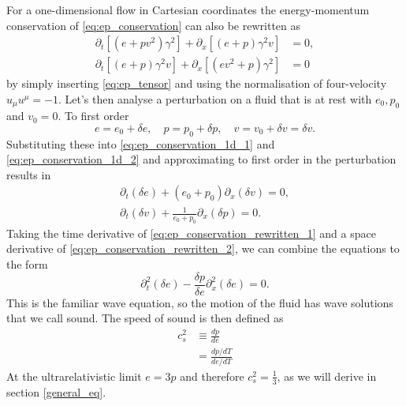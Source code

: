 For a one-dimensional flow in Cartesian coordinates the energy-momentum conservation of \eqref{eq:ep_conservation} can also be rewritten as
\begin{align}
\partial_t \left[ (e+pv^2) \gamma^2 \right] + \partial_x \left[ (e+p) \gamma^2 v \right] &= 0,
\label{eq:ep_conservation_1d_1} \\
\partial_t \left[ (e+p) \gamma^2 v \right] + \partial_x \left[ (ev^2 + p) \gamma^2 \right] &= 0
\label{eq:ep_conservation_1d_2}
\end{align}
by simply inserting \eqref{eq:ep_tensor} and using the normalisation of four-velocity $u_\mu u^\mu = -1$.
Let's then analyse a perturbation on a fluid that is at rest with $e_0, p_0$ and $v_0 = 0$.
To first order
\begin{equation}
e = e_0 + \delta e, \quad p=p_0 + \delta p, \quad v = v_0 + \delta v = \delta v.
\end{equation}
Substituting these into \eqref{eq:ep_conservation_1d_1} and \eqref{eq:ep_conservation_1d_2} and approximating to first order in the perturbation results in
\begin{align}
\partial_t (\delta e) + (e_0 + p_0) \partial_x (\delta v) = 0,
\label{eq:ep_conservation_rewritten_1} \\
\partial_t (\delta v) + \frac{1}{e_0 + p_0} \partial_x (\delta p) = 0.
\label{eq:ep_conservation_rewritten_2}
\end{align}
Taking the time derivative of \eqref{eq:ep_conservation_rewritten_1} and a space derivative of \eqref{eq:ep_conservation_rewritten_2}, we can combine the equations to the form
\begin{equation}
\partial_t^2 (\delta e) - \frac{\delta p}{\delta e} \partial_x^2(\delta e) = 0.
\label{eq:wave_equation}
\end{equation}
This is the familiar wave equation,
so the motion of the fluid has wave solutions that we call sound.
\cites[ch. 4.3]{rezzolla_relativistic_2013}[ch. 7.4]{lecture_notes}
The speed of sound is then defined as
\cites[eq. 2.168]{rezzolla_relativistic_2013}[eq. 13]{giese_2020}[eq. 3]{giese_2021}
\begin{align}
c_s^2
&\equiv \frac{dp}{de}
\label{eq:cs2_compact} \\
&= \frac{dp/dT}{de/dT}
\label{eq:cs2_explicit}
\end{align}
At the ultrarelativistic limit $e=3p$ and therefore $c_s^2=\frac{1}{3}$, as we will derive in section \ref{general_eq}.

\iffalse
The
\href{https://en.wikipedia.org/wiki/Clausius\%E2\%80\%93Clapeyron_relation}{Clausius-Clapeyron relation} states that
\cite[eq. 5.47, 5.48]{schroeder_thermal_2000}
\begin{equation}
\frac{dp}{dT} = \frac{L}{T \Delta V} = \frac{\Delta S}{\Delta V}.
\end{equation}
\fi

